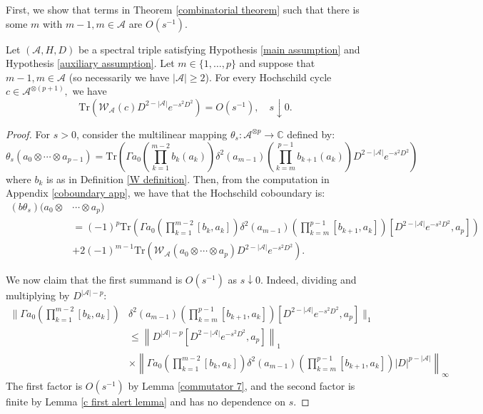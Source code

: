     First, we show that terms in Theorem \ref{combinatorial theorem} such that there is some $m$ with $m-1,m \in \mathscr{A}$ are $O(s^{-1})$.
    \begin{lem}\label{kogom2} 
        Let $(\mathcal{A},H,D)$ be a spectral triple satisfying Hypothesis \ref{main assumption} and Hypothesis \ref{auxiliary assumption}. Let $m \in \{1,\ldots,p\}$ and suppose that $m-1,m\in\mathscr{A}$ (so necessarily we have $|\mathscr{A}|\geq 2$). 
        For every Hochschild cycle $c\in\mathscr{A}^{\otimes (p+1)},$ we have
        \begin{equation*}
            \mathrm{Tr}(\mathcal{W}_{\mathscr{A}}(c)D^{2-|\mathscr{A}|}e^{-s^2D^2}) = O(s^{-1}),\quad s\downarrow 0.
        \end{equation*}
    \end{lem}
    \begin{proof} 
        For $s > 0$, consider the multilinear mapping $\theta_s:\mathcal{A}^{\otimes p}\to \mathbb{C}$ defined by:
        \begin{equation*}
            \theta_s(a_0\otimes \cdots \otimes a_{p-1}) = \mathrm{Tr}\left(\Gamma a_0\left(\prod_{k=1}^{m-2}b_k(a_k)\right)\delta^2(a_{m-1})\left(\prod_{k=m}^{p-1}b_{k+1}(a_k)\right)D^{2-|\mathscr{A}|}e^{-s^2D^2}\right)
        \end{equation*}
        where $b_k$ is as in Definition \ref{W definition}. Then, from the computation in Appendix \ref{coboundary app}, we have that the Hochschild coboundary is:
        \begin{align*}
            (b\theta_s)(a_0\otimes &\cdots \otimes a_p)\\
                                   &= (-1)^p\mathrm{Tr}\left(\Gamma a_0\left(\prod_{k=1}^{m-2}[b_k,a_k]\right)\delta^2(a_{m-1})\left(\prod_{k=m}^{p-1}[b_{k+1},a_k]\right)[D^{2-|\mathscr{A}|}e^{-s^2D^2},a_p]\right)\\
                                   &+ 2(-1)^{m-1}\mathrm{Tr}(\mathcal{W}_{\mathscr{A}}(a_0\otimes \cdots \otimes a_p)D^{2-|\mathscr{A}|}e^{-s^2D^2}). 
        \end{align*}
        
        We now claim that the first summand is $O(s^{-1})$ as $s\downarrow 0$. Indeed, dividing and multiplying by $D^{|\mathscr{A}|-p}$:
        \begin{align*}
            \Big\|\Gamma a_0\left(\prod_{k=1}^{m-2}[b_k,a_k]\right)&\delta^2(a_{m-1})\left(\prod_{k=m}^{p-1}[b_{k+1},a_k]\right)[D^{2-|\mathscr{A}|}e^{-s^2D^2},a_p]\Big\|_1\\
                                                                   &\leq \left\|D^{|\mathscr{A}|-p}[D^{2-|\mathscr{A}|}e^{-s^2D^2},a_p]\right\|_1\\
                                                                   &\times \left\|\Gamma a_0\left(\prod_{k=1}^{m-2}[b_k,a_k]\right)\delta^2(a_{m-1})\left(\prod_{k=m}^{p-1}[b_{k+1},a_k]\right)|D|^{p-|\mathscr{A}|}\right\|_\infty 
        \end{align*}
        The first factor is $O(s^{-1})$ by Lemma \ref{commutator 7}, and the second factor is finite by Lemma \ref{c first alert lemma} and has no dependence on $s$.
        

\end{proof}
